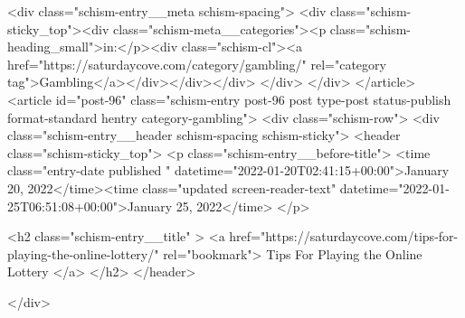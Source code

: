 {		<div class="schism-entry__meta schism-spacing">			<div class="schism-sticky_top"><div class="schism-meta__categories"><p class="schism-heading_small">in:</p><div class="schism-cl"><a href="https://saturdaycove.com/category/gambling/" rel="category tag">Gambling</a></div></div></div>		</div>
	</div>
</article>
<article id="post-96" class="schism-entry post-96 post type-post status-publish format-standard hentry category-gambling">
	<div class="schism-row">		<div class="schism-entry__header schism-spacing schism-sticky">			<header class="schism-sticky_top">				<p class="schism-entry__before-title">
					<time class="entry-date published " datetime="2022-01-20T02:41:15+00:00">January 20, 2022</time><time class="updated screen-reader-text" datetime="2022-01-25T06:51:08+00:00">January 25, 2022</time>				</p>

				<h2 class="schism-entry__title" >
					<a href="https://saturdaycove.com/tips-for-playing-the-online-lottery/" rel="bookmark">
						Tips For Playing the Online Lottery					</a>
				</h2>
			</header>

					</div>

}
